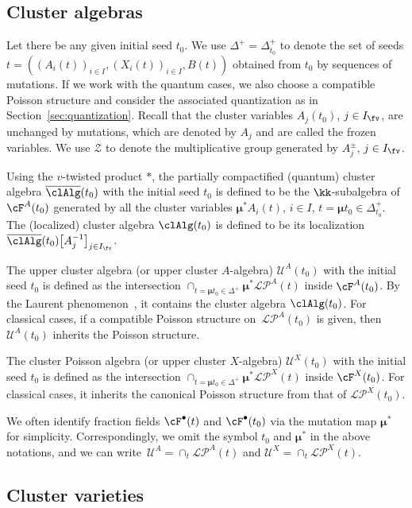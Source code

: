 \documentclass[pdftex]{sigma}
\newcommand{\Ifv}{I_{\fv}}
\newcommand{\upClAlg}{\mathcal{U}^A}
\newcommand{\XClAlg}{\mathcal{U}^X}
\newcommand{\LP}{{\mathcal{LP}}}
\newcommand{\bClAlg}{{\overline{\clAlg}}}
\newcommand{\fFac}{\mathcal{Z}}
\newcommand{\seq}{\boldsymbol{\mu}}%
\numberwithin{equation}{section}
\begin{document}
\subsection{Cluster algebras}

Let there be any given initial seed $t_{0}$. We use $\Delta^{+}=\Delta_{t_{0}}^{+}$
to denote the set of seeds $t=((A_{i}(t))_{i\in I},(X_{i}(t))_{i\in I},B(t))$
obtained from $t_{0}$ by sequences of mutations. If we work with the quantum cases, we also choose a compatible Poisson structure and consider the associated quantization as in Section~\ref{sec:quantization}. Recall that the
cluster variables $A_{j}(t_{0})$, $j\in I_{\fv}$, are unchanged
by mutations, which are denoted by $A_{j}$ and are called the frozen
variables. We use $\fFac$ to denote the multiplicative group generated
by $A_{j}^{\pm}$, $j\in\Ifv$.

Using the $v$-twisted product $*$, the partially compactified (quantum) cluster algebra $\bClAlg(t_{0})$ with
the initial seed $t_{0}$ is defined to be the $\kk$-subalgebra of
$\cF^{A}(t_{0})$ generated by all the cluster variables $\seq^{*}A_{i}(t)$,
$i\in I$, $t=\seq t_{0}\in\Delta_{t_{0}}^{+}$. The (localized) cluster
algebra $\clAlg(t_{0})$ is defined to be its localization $\bClAlg(t_{0})\big[A_{j}^{-1}\big]_{j\in I_{\fv}}$.

The upper cluster algebra (or upper cluster $A$-algebra) $\upClAlg(t_{0})$
with the initial seed $t_{0}$ is defined as the intersection $\cap_{t=\seq t_{0}\in\Delta^{+}}\seq^{*}\LP^{A}(t)$
inside $\cF^{A}(t_{0})$. By the Laurent phenomenon~\cite{BerensteinZelevinsky05,FominZelevinsky02},
it contains the cluster algebra $\clAlg(t_{0})$. For classical cases, if a compatible
Poisson structure on~$\LP^{A}(t_{0})$ is given, then $\upClAlg(t_{0})$
inherits the Poisson structure.

The cluster Poisson algebra (or upper cluster $X$-algebra) $\XClAlg(t_{0})$
with the initial seed $t_{0}$ is defined as the intersection $\cap_{t=\seq t_{0}\in\Delta^{+}}\seq^{*}\LP^{X}(t)$
inside $\cF^{X}(t_{0})$. For classical cases, it inherits the canonical Poisson structure
from that of $\LP^{X}(t_{0})$.

We often identify fraction fields $\cF^{\bullet}(t)$ and $\cF^{\bullet}(t_{0})$
via the mutation map $\seq^{*}$ for simplicity. Correspondingly,
we omit the symbol $t_{0}$ and $\seq^{*}$ in the above notations,
and we can write~${\upClAlg=\cap_{t}\LP^{A}(t)}$ and $\XClAlg=\cap_{t}\LP^{X}(t)$.

\subsection{Cluster varieties}
\end{document}
